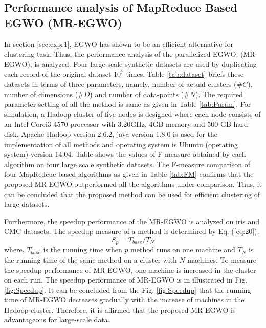 \documentclass[review]{elsarticle}
\begin{document}
\subsection{Performance analysis of MapReduce Based EGWO (MR-EGWO)}\label{sec:expr2}
In section \ref{sec:expr1}, EGWO has shown to be an efficient alternative for clustering task. Thus, the performance analysis of the parallelized EGWO, (MR-EGWO), is analyzed. Four large-scale synthetic datasets are used by duplicating each record of the original dataset $10^7$ times. Table \ref{tab:dataset} briefs these datasets in terms of three parameters, namely, number of actual clusters ($\#C$), number of dimensions ($\#D$) and number of data-points ($\#N$). The required parameter setting of all the method is same as given in Table \ref{tab:Param}.
For simulation, a Hadoop cluster of five nodes is designed where each node consists of an Intel Corei3-4570 processor with 3.20GHz, 4GB memory and 500 GB hard disk. Apache Hadoop version 2.6.2, java version 1.8.0 is used for the implementation of all methods and operating system is Ubuntu (operating system) version 14.04. 
Table \label{tab:FM} shows the values of F-measure obtained by each algorithm on four large scale synthetic datasets. The F-measure comparison of four MapRedcue based algorithms as given in Table \ref{tab:FM} confirms that the proposed MR-EGWO outperformed all the algorithms under comparison. Thus, it can be concluded that the proposed method can be used for efficient clustering of large datasets.

Furthermore, the speedup performance of the MR-EGWO is analyzed on iris and CMC datasets. The speedup measure of a method is determined by Eq. (\ref{eq:20}).
  \begin{equation}\label{eq:20}                                                            			
       S_p=T_{base}/T_N                                                     		
   \end{equation}
where, $T_{base}$ is the running time when $p$ method runs on one machine and $T_N$ is the running time of the same method on a cluster with $N$ machines. To measure the speedup performance of MR-EGWO, one machine is increased in the cluster on each run. The speedup performance of MR-EGWO is in illustrated in Fig. \ref{fig:Speedup}. It can be concluded from the Fig. \ref{fig:Speedup} that the running time of MR-EGWO decreases gradually with the increase of machines in the Hadoop cluster. Therefore, it is affirmed that the proposed MR-EGWO is advantageous for large-scale data.
\end{document}
